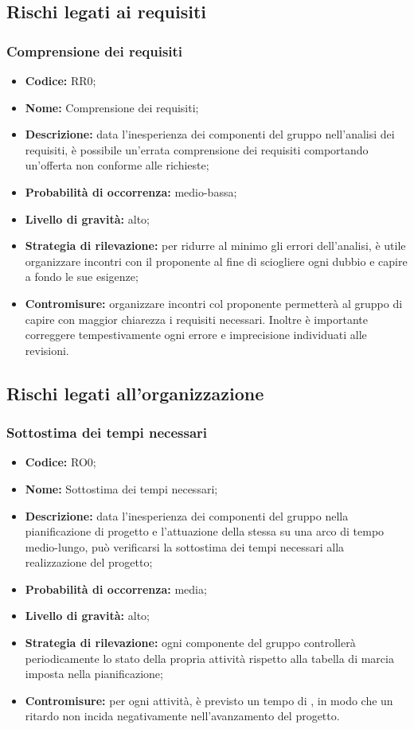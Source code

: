 \documentclass[../PianodiProgetto.tex]{subfiles}
\begin{document}
	\subsection{Rischi legati ai requisiti}
	\subsubsection{Comprensione dei requisiti}
	\begin{itemize}
		\item \textbf{Codice:} RR0;
		\item \textbf{Nome:} Comprensione dei requisiti;
		\item \textbf{Descrizione:} data l'inesperienza dei componenti del gruppo nell'analisi dei requisiti, è possibile un'errata comprensione dei requisiti comportando un'offerta non conforme alle richieste;
		\item \textbf{Probabilità di occorrenza:} medio-bassa;
		\item \textbf{Livello di gravità:} alto;
		\item \textbf{Strategia di rilevazione:} per ridurre al minimo gli errori dell'analisi, è utile organizzare incontri con il proponente al fine di sciogliere ogni dubbio e capire a fondo le sue esigenze;
		\item \textbf{Contromisure:} organizzare incontri col proponente permetterà al gruppo di capire con maggior chiarezza i requisiti necessari. Inoltre è importante correggere tempestivamente ogni errore e imprecisione individuati alle revisioni. 
	\end{itemize}
	
	\subsection{Rischi legati all'organizzazione}
	\subsubsection{Sottostima dei tempi necessari}
	\begin{itemize}
		\item \textbf{Codice:} RO0;
		\item \textbf{Nome:} Sottostima dei tempi necessari;
		\item \textbf{Descrizione:} data l'inesperienza dei componenti del gruppo nella pianificazione di progetto e l'attuazione della stessa su una arco di tempo medio-lungo, può verificarsi la sottostima dei tempi necessari alla realizzazione del progetto;
		\item \textbf{Probabilità di occorrenza:} media;
		\item \textbf{Livello di gravità:} alto;
		\item \textbf{Strategia di rilevazione:} ogni componente del gruppo controllerà periodicamente lo stato della propria attività rispetto alla tabella di marcia imposta nella pianificazione;
		\item \textbf{Contromisure:} per ogni attività, è previsto un tempo di , in modo che un ritardo non incida negativamente nell'avanzamento del progetto.
	\end{itemize}
\end{document}
